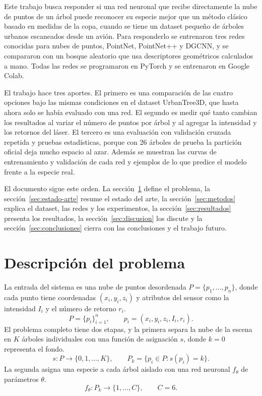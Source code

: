 \documentclass[preprint,12pt]{elsarticle}
\begin{document}
Este trabajo busca responder si una red neuronal que recibe directamente la nube de puntos de un árbol puede reconocer su especie mejor que un método clásico basado en medidas de la copa, cuando se tiene un dataset pequeño de árboles urbanos escaneados desde un avión. Para responderlo se entrenaron tres redes conocidas para nubes de puntos, PointNet, PointNet++ y DGCNN, y se compararon con un bosque aleatorio que usa descriptores geométricos calculados a mano. Todas las redes se programaron en PyTorch y se entrenaron en Google Colab.

El trabajo hace tres aportes. El primero es una comparación de las cuatro opciones bajo las mismas condiciones en el dataset UrbanTree3D, que hasta ahora solo se había evaluado con una red. El segundo es medir qué tanto cambian los resultados al variar el número de puntos por árbol y al agregar la intensidad y los retornos del láser. El tercero es una evaluación con validación cruzada repetida y pruebas estadísticas, porque con 26 árboles de prueba la partición oficial deja mucho espacio al azar. Además se muestran las curvas de entrenamiento y validación de cada red y ejemplos de lo que predice el modelo frente a la especie real.

El documento sigue este orden. La sección~\ref{sec:problema} define el problema, la sección~\ref{sec:estado-arte} resume el estado del arte, la sección~\ref{sec:metodos} explica el dataset, las redes y los experimentos, la sección~\ref{sec:resultados} presenta los resultados, la sección~\ref{sec:discusion} los discute y la sección~\ref{sec:conclusiones} cierra con las conclusiones y el trabajo futuro.

\section{Descripción del problema}
\label{sec:problema}

La entrada del sistema es una nube de puntos desordenada $P=\{p_1,\dots,p_n\}$, donde cada punto tiene coordenadas $(x_i,y_i,z_i)$ y atributos del sensor como la intensidad $I_i$ y el número de retorno $r_i$.
\begin{equation}
P = \{p_i\}_{i=1}^{n}, \qquad p_i = (x_i, y_i, z_i, I_i, r_i).
\label{eq:pointcloud}
\end{equation}
El problema completo tiene dos etapas, y la primera separa la nube de la escena en $K$ árboles individuales con una función de asignación $s$, donde $k=0$ representa el fondo.
\begin{equation}
s : P \rightarrow \{0, 1, \dots, K\}, \qquad P_k = \{p_i \in P : s(p_i) = k\}.
\label{eq:instancias}
\end{equation}
La segunda asigna una especie a cada árbol aislado con una red neuronal $f_\theta$ de parámetros $\theta$.
\begin{equation}
f_\theta : P_k \rightarrow \{1, \dots, C\}, \qquad C = 6.
\label{eq:clasificacion}
\end{equation}
\end{document}
